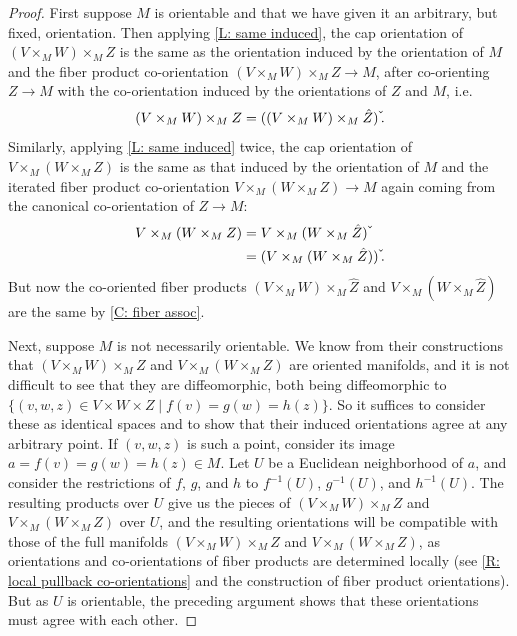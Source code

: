 \begin{proof}
	First suppose $M$ is orientable and that we have given it an arbitrary, but fixed, orientation.
	Then applying \cref{L: same induced}, the cap orientation of $(V \times_M W) \times_M Z$ is the same as the orientation induced by the orientation of $M$ and the fiber product co-orientation $(V \times_M W) \times_M Z \to M$, after co-orienting $Z \to M$ with the co-orientation induced by the orientations of $Z$ and $M$, i.e.\ $$(V \times_M W) \times_M Z = ((V \times_M W) \times_M \hat Z)\,\check{\vrule height1.3ex width0pt}.$$
	Similarly, applying \cref{L: same induced} twice, the cap orientation of $V \times_M (W \times_M Z)$ is the same as that induced by the orientation of $M$ and the iterated fiber product co-orientation $V \times_M (W \times_M Z) \to M$ again coming from the canonical co-orientation of $Z \to M$:
	\begin{align*}
		V \times_M (W \times_M Z) &= V \times_M (W \times_M \hat Z)\,\check{\vrule height1.3ex width0pt}\\
		&=(V \times_M (W \times_M \hat Z))\,\check{\vrule height1.3ex width0pt}.
	\end{align*}
	But now the co-oriented fiber products $(V \times_M W) \times_M \hat Z$ and $V \times_M (W \times_M \hat Z)$ are the same by \cref{C: fiber assoc}.

	Next, suppose $M$ is not necessarily orientable.
	We know from their constructions that $(V \times_M W) \times_M Z$ and $V \times_M (W \times_M Z)$ are oriented manifolds, and it is not difficult to see that they are diffeomorphic, both being diffeomorphic to $\{(v,w,z) \in V \times W \times Z \mid f(v) = g(w) = h(z)\}$.
	So it suffices to consider these as identical spaces and to show that their induced orientations agree at any arbitrary point.
	If $(v,w,z)$ is such a point, consider its image $a = f(v) = g(w) = h(z) \in M$.
	Let $U$ be a Euclidean neighborhood of $a$, and consider the restrictions of $f$, $g$, and $h$ to $f^{-1}(U)$, $g^{-1}(U)$, and $h^{-1}(U)$.
	The resulting products over $U$ give us the pieces of $(V \times_M W) \times_M Z$ and $V \times_M (W \times_M Z)$ over $U$, and the resulting orientations will be compatible with those of the full manifolds $(V \times_M W) \times_M Z$ and $V \times_M (W \times_M Z)$, as orientations and co-orientations of fiber products are determined locally (see \cref{R: local pullback co-orientations} and the construction of fiber product orientations).
	But as $U$ is orientable, the preceding argument shows that these orientations must agree with each other.
\end{proof}

